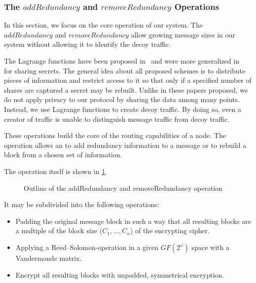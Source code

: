 \subsubsection{The \texorpdfstring{$addRedundancy$}{addRedundancy} and \texorpdfstring{$removeRedundancy$}{removeRedundancy} Operations}\label{sec:redundancyOperation}
In this section, we focus on the core operation of our system. The $addRedundancy$ and $removeRedundancy$ allow growing message sizes in our system without allowing it to identify the decoy traffic. 

The Lagrange functions have been proposed in~\cite{shamir1979share} and were more generalized in~\cite{mceliece1981sharing} for sharing secrets. The general idea about all proposed schemes is to distribute pieces of information and restrict access to it so that only if a specified number of shares are captured a secret may be rebuilt. Unlike in these papers proposed, we do not apply privacy to our protocol by sharing the data among many points. Instead, we use Lagrange functions to create decoy traffic. By doing so, even a creator of traffic is unable to distinguish message traffic from decoy traffic. 

These operations build the core of the routing capabilities of a node. The operation allows an  to add redundancy %
information to a message or to rebuild a block from a chosen set of information. 

The operation itself is shown in \cref{fig:addRedundancyOperation}. 

\begin{figure}[ht]\centering
	\resizebox{0.48\textwidth}{!}{}
	\resizebox{0.45\textwidth}{!}{}
	\caption{Outline of the addRedundancy and removeRedundancy operation}
	\label{fig:addRedundancyOperation}
\end{figure}

It may be subdivided into the following operations:
\begin{itemize}
	\item Padding the original message block in such a way that all resulting blocks are a multiple of the block size ($C_1,\ldots, C_n$) of the encrypting cipher.
	\item Applying a Reed--Solomon-operation in a given $GF(2^\omega)$ space with a Vandermonde matrix.
	\item Encrypt all resulting blocks with unpadded, symmetrical encryption.
\end{itemize}

